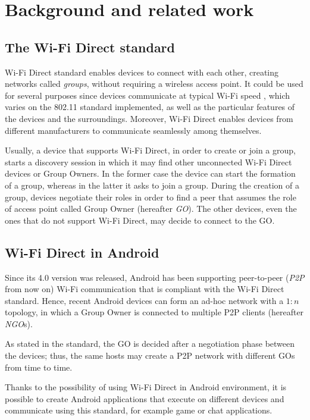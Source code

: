 \section{Background and related work} %
\subsection{The Wi-Fi Direct standard}
Wi-Fi Direct standard enables devices to connect with each other, creating 
networks called \textit{groups}, without requiring a wireless access point. It
could be used for several purposes since devices communicate at typical Wi-Fi
speed \cite{bib:wifiP2pspec}, which varies on the 802.11 standard implemented,
as well as the particular features of the devices and the surroundings.
Moreover, Wi-Fi Direct enables devices from different manufacturers to
communicate seamlessly among themselves.

Usually, a device that supports Wi-Fi Direct, in order to create or join a
group, starts a discovery session in which it may find other unconnected Wi-Fi
Direct devices or Group Owners.
In the former case the device can start the formation of a group, whereas in
the latter it asks to join a group.
During the creation of a group,
devices negotiate their roles in order to find a peer that assumes the role of 
access point called Group Owner (hereafter \textit{GO}). The other devices,
even the ones that do not support Wi-Fi Direct, may decide to connect to the
GO.

\subsection{Wi-Fi Direct in Android}
Since its 4.0 version was released, Android has been supporting peer-to-peer 
(\textit{P2P} from now on) Wi-Fi communication that is compliant with the 
Wi-Fi Direct standard\cite{bib:wifiP2pspec}. 
Hence, recent Android devices can form an ad-hoc network with a $1:n$ topology,
in which a Group Owner is connected to multiple P2P clients (hereafter \textit{NGO}s).

As stated in the standard, the GO is decided after a negotiation phase between
the devices; thus, the same hosts may create a P2P network with different GOs
from time to time.

Thanks to the possibility of using Wi-Fi Direct in Android environment, it is 
possible to create Android applications that execute on different devices and 
communicate using this standard, for example game or chat applications. 

